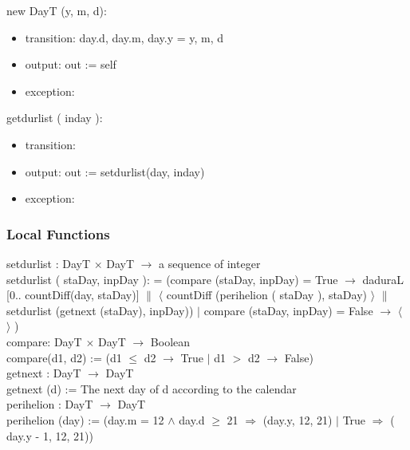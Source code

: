 \documentclass[12pt, titlepage]{article}
\begin{document}
\noindent  new DayT (y, m, d):
\begin{itemize}
\item transition:  day.d, day.m, day.y = y, m, d\\

\item output: out := self
\item exception: 
\end{itemize}

\noindent  getdurlist ( inday ):
\begin{itemize}
\item transition: 
\item output: out := setdurlist(day, inday)
\item exception:
\end{itemize}


\subsubsection{Local Functions}
setdurlist : DayT $\times$ DayT $\rightarrow $ a sequence of integer\\
setdurlist ( staDay, inpDay ): = (compare (staDay, inpDay) = True $\rightarrow $ daduraL [0.. countDiff(day, staDay)] $\|$ $\langle$ countDiff (perihelion ( staDay ), staDay) $\rangle$ $\|$ setdurlist (getnext (staDay), inpDay)) $|$ compare (staDay, inpDay) = False $\rightarrow $ $\langle$ $\rangle$ )\\


compare: DayT $\times$ DayT $\rightarrow $ Boolean\\
compare(d1, d2) := (d1 $\leq$ d2 $\rightarrow $ True $|$ d1 $>$ d2 $\rightarrow $ False)\\


getnext : DayT $\rightarrow $ DayT\\
getnext (d) := The next day of d according to the calendar\\

perihelion : DayT $\rightarrow $ DayT\\
perihelion (day) :=  (day.m = 12 $	\wedge$ day.d $\geq	$ 21 $\Rightarrow$  (day.y, 12, 21) $|$ True $\Rightarrow$ ( day.y - 1, 12, 21))\\
\end{document}
